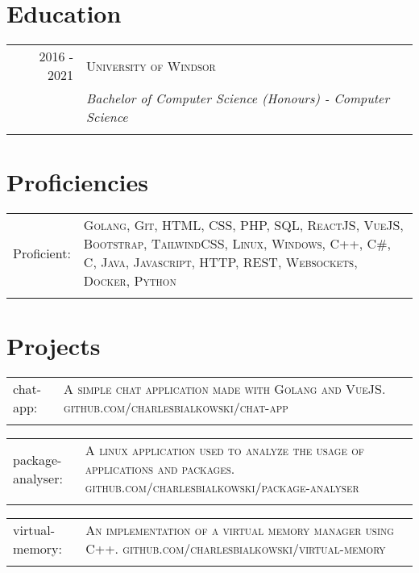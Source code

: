\documentclass[a4paper,10pt]{article}
\begin{document}
\section{Education}

\begin{tabular}{r|p{11cm}}

	\textsc{2016 - 2021}&\textsc{University of Windsor} \\\textsc{}&\emph{Bachelor of Computer Science (Honours) - Computer Science}\\\multicolumn{2}{c}{}\\

\end{tabular}

\section{Proficiencies}

\begin{tabular}{p{2cm}p{11cm}}
	Proficient:& \textsc{Golang, Git, HTML, CSS, PHP, SQL, ReactJS, VueJS, Bootstrap, TailwindCSS, Linux, Windows, C++, C\#, C, Java, Javascript, HTTP, REST, Websockets, Docker, Python}\\\\	
\end{tabular}

\section{Projects}
\begin{tabular}{p{2cm}p{11cm}}
	chat-app:&\textsc{A simple chat application made with Golang and VueJS. github.com/charlesbialkowski/chat-app}\\\\
\end{tabular}

\begin{tabular} {p{2cm}p{11cm}}
	package-analyser:&\textsc{A linux application used to analyze the usage of applications and packages. github.com/charlesbialkowski/package-analyser} \\\\	
\end{tabular}

\begin{tabular}{p{2cm}p{11cm}}
	virtual-memory:&\textsc{An implementation of a virtual memory manager using C++. github.com/charlesbialkowski/virtual-memory} \\\\
\end{tabular}
\end{document}
